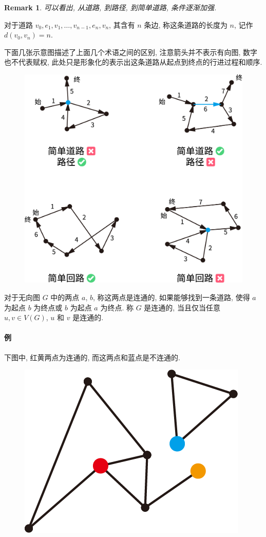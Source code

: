 \documentclass[UTF8]{ctexart}
\theoremstyle{mystyle}
\theoremstyle{myremark}
\newtheorem*{remark}{Remark}
\theoremstyle{plain}
\begin{document}
\begin{remark}
    可以看出, 从道路, 到路径, 到简单道路, 条件逐渐加强.
\end{remark}

对于道路 $ v_0, e_1, v_1, \dots, v_{n - 1}, e_n, v_n $, 其含有 $ n $ 条边, 称这条道路的长度为 $ n $, 记作 $ d(v_0, v_n) = n $.

下面几张示意图描述了上面几个术语之间的区别, 注意箭头并不表示有向图, 数字也不代表赋权, 此处只是形象化的表示出这条道路从起点到终点的行进过程和顺序.
\begin{figure}[H]
    \centering
    \includegraphics[width = 0.7\linewidth]{./images/path_trail.png}
\end{figure}


\begin{definition}[\text{连通}]
    对于无向图 $ G $ 中的两点 $ a $, $ b $, 称这两点是连通的, 如果能够找到一条道路, 使得 $ a $ 为起点 $ b $ 为终点或 $ b $ 为起点 $ a $ 为终点. 称 $ G $ 是连通的, 当且仅当任意 $ u, v \in V(G) $, $ u $ 和 $ v $ 是连通的.
\end{definition}

\paragraph{例}
下图中, 红黄两点为连通的, 而这两点和蓝点是不连通的.
\begin{figure}[H]
    \centering
    \includegraphics[width = 0.25\linewidth]{./images/connected_1.png}
\end{figure}
\end{document}
